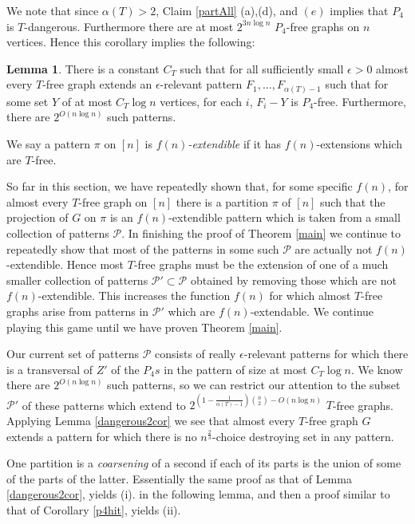 \documentclass[12pt]{article}
\theoremstyle{definition}
\newtheorem{lemma}[theorem]{Lemma}
\newcommand\cP{\mathcal P}
\begin{document}
We note that since $\alpha(T)>2$, Claim \ref{partAll} (a),(d), and $(e)$ implies that $P_4$ is $T$-dangerous. 
Furthermore there are at most $2^{3 n\log n}$ $P_4$-free graphs on $n$ vertices. Hence this corollary implies the following:  

\begin{lemma} 
There is a constant $C_T$ such that  for all  sufficiently small $\epsilon >0$ almost every $T$-free graph extends an $\epsilon$-relevant pattern $F_1,...,F_{\alpha(T)-1}$ such that for some set $Y$ of at most 
$C_T \log n$ vertices, for each $i$,  $F_i-Y$ is $P_4$-free. Furthermore,  there are $2^{O(n \log n)}$ such patterns. 
\end{lemma}







  We say a pattern $\pi$ on  $[n]$ is {\it $f(n)$-extendible} if it has $f(n)$-extensions which are $T$-free. 
  
 So far in this section, we  have repeatedly shown that, for some specific $f(n)$, for almost every $T$-free graph on $[n] $ there is a partition  $\pi$ of $[n]$ such that the projection of $G$ on $\pi$ is  an $f(n)$-extendible  pattern  which is taken from a small collection of patterns $\cP$. In finishing the  proof of  Theorem \ref{main} we continue to repeatedly  show that most of  the patterns in  some such $\cP$ are actually not $f(n)$-extendible.  Hence most $T$-free graphs must be the extension of one of a much smaller collection of patterns $\cP'\subset \cP$ obtained by removing those which are not $f(n)$-extendible. This increases the function $f(n)$ for which almost   $T$-free graphs  arise from patterns  in $\cP'$ which are $f(n)$-extendable. We continue playing this game until we have proven Theorem   \ref{main}.  

Our current set of patterns $\cP$ consists of really $\epsilon$-relevant patterns for which there is a transversal of 
$Z'$ of the $P_4s$ in the pattern of size at most $C_T \log n$. We know there are $2^{O(n\log n)}$ such patterns,
so  we can restrict our attention to the subset $\cP'$ of these patterns which    extend to  $2^{(1-\frac{1}{\alpha(T)-1}){n \choose 2}-O(n\log n)}$ $T$-free graphs. Applying Lemma  \ref{dangerous2cor} we see that almost every $T$-free graph $G$ extends  a pattern for which  there is  no $n^\frac{2}{3}$-choice destroying set in  any pattern. 

One partition is a {\it coarsening} of a second if each of its parts is the union of some of the parts of the latter.  
Essentially the same proof  as that of Lemma \ref{dangerous2cor},  yields (i).
in the following lemma, and then a proof similar to that of Corollary \ref{p4hit}, yields (ii).
\end{document}
